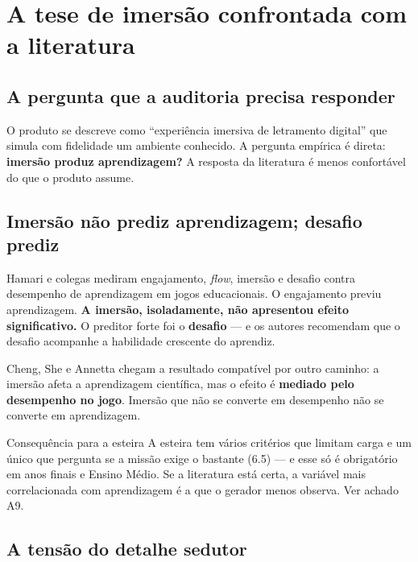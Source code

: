 \documentclass[11pt,a4paper]{article}
\begin{document}
\section{A tese de imers\~ao confrontada com a literatura}

\subsection{A pergunta que a auditoria precisa responder}

O produto se descreve como ``experi\^encia imersiva de letramento digital'' que simula com
fidelidade um ambiente conhecido. A pergunta emp\'irica \'e direta: \textbf{imers\~ao produz
aprendizagem?} A resposta da literatura \'e menos confort\'avel do que o produto assume.

\subsection{Imers\~ao n\~ao prediz aprendizagem; desafio prediz}

Hamari e colegas \cite{hamari2016} mediram engajamento, \emph{flow}, imers\~ao e desafio contra
desempenho de aprendizagem em jogos educacionais. O engajamento previu aprendizagem. \textbf{A
imers\~ao, isoladamente, n\~ao apresentou efeito significativo.} O preditor forte foi o
\textbf{desafio} --- e os autores recomendam que o desafio acompanhe a habilidade crescente do
aprendiz.

Cheng, She e Annetta \cite{cheng2015} chegam a resultado compat\'ivel por outro caminho: a
imers\~ao afeta a aprendizagem cient\'ifica, mas o efeito \'e \textbf{mediado pelo desempenho no
jogo}. Imers\~ao que n\~ao se converte em desempenho n\~ao se converte em aprendizagem.

\begin{notabox}{Consequ\^encia para a esteira}
A esteira tem v\'arios crit\'erios que limitam carga e um \'unico que pergunta se a miss\~ao exige
o bastante (6.5) --- e esse s\'o \'e obrigat\'orio em anos finais e Ensino M\'edio. Se a
literatura est\'a certa, a vari\'avel mais correlacionada com aprendizagem \'e a que o gerador
menos observa. Ver achado A9.
\end{notabox}

\subsection{A tens\~ao do detalhe sedutor}
\label{sec:sedutor}
\end{document}
